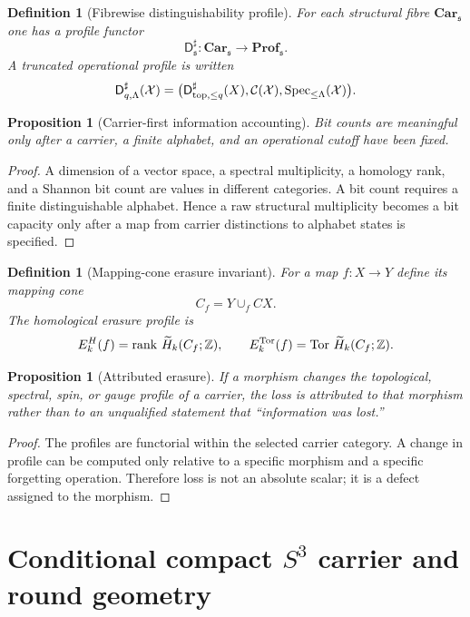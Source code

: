 \documentclass[11pt,a4paper]{article}
\newtheorem{proposition}[theorem]{Proposition}
\newtheorem{definition}[theorem]{Definition}
\newcommand{\DRD}{\mathsf D^{\sharp}}
\newcommand{\Spec}{\operatorname{Spec}}
\begin{document}
\begin{definition}[Fibrewise distinguishability profile]
For each structural fibre $\mathbf{Car}_{\mathfrak s}$ one has a profile functor
\[
\DRD_{\mathfrak s}:\mathbf{Car}_{\mathfrak s}\longrightarrow \mathbf{Prof}_{\mathfrak s}.
\]
A truncated operational profile is written
\[
\DRD_{q,\Lambda}(\mathcal X)=
\bigl(\DRD_{{\rm top},\le q}(X),\mathcal C(\mathcal X),\Spec_{\le\Lambda}(\mathcal X)\bigr).
\]
\end{definition}

\begin{proposition}[Carrier-first information accounting]
Bit counts are meaningful only after a carrier, a finite alphabet, and an operational cutoff have been fixed.
\end{proposition}
\begin{proof}
A dimension of a vector space, a spectral multiplicity, a homology rank, and a Shannon bit count are values in different categories.  A bit count requires a finite distinguishable alphabet.  Hence a raw structural multiplicity becomes a bit capacity only after a map from carrier distinctions to alphabet states is specified.\end{proof}

\begin{definition}[Mapping-cone erasure invariant]
For a map $f:X\to Y$ define its mapping cone
\[
C_f=Y\cup_f CX.
\]
The homological erasure profile is
\[
E_k^H(f)=\operatorname{rank}\,\widetilde H_k(C_f;\mathbb Z),\qquad
E_k^{\rm Tor}(f)=\operatorname{Tor}\,\widetilde H_k(C_f;\mathbb Z).
\]
\end{definition}

\begin{proposition}[Attributed erasure]
If a morphism changes the topological, spectral, spin, or gauge profile of a carrier, the loss is attributed to that morphism rather than to an unqualified statement that ``information was lost.''
\end{proposition}
\begin{proof}
The profiles are functorial within the selected carrier category.  A change in profile can be computed only relative to a specific morphism and a specific forgetting operation.  Therefore loss is not an absolute scalar; it is a defect assigned to the morphism.\end{proof}

\section{Conditional compact $S^3$ carrier and round geometry}
\end{document}

